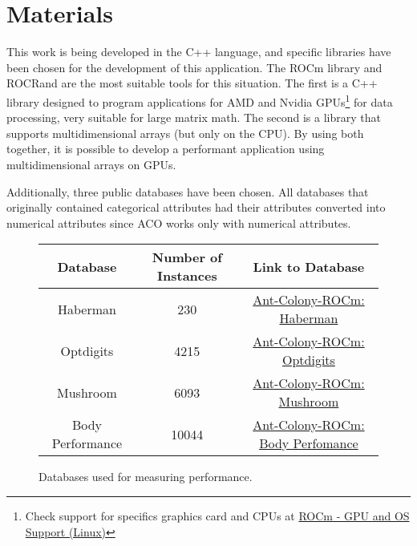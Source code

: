 \section{Materials} \label{Materials}

This work is being developed in the C++ language, and specific libraries have been chosen for the development of this application. The ROCm library\cite{rocm} and ROCRand\cite{rocrand} are the most suitable tools for this situation.
The first is a C++ library designed to program applications for AMD and Nvidia GPUs\footnote[1]{Check support for specifics graphics card and CPUs at \href{https://rocm.docs.amd.com/en/latest/release/gpu_os_support.html}{ROCm - GPU and OS Support (Linux)}} for data processing, very suitable for large matrix math.
The second is a library that supports multidimensional arrays (but only on the CPU). By using both together, it is possible to develop a performant application using multidimensional arrays on GPUs.

Additionally, three public databases have been chosen. All databases that originally contained categorical attributes had their attributes converted into numerical attributes since ACO works only with numerical attributes.

\begin{figure}
    \begin{center}
        \begin{tabular}{|c|c|c|}
            \hline
            Database & Number of Instances & Link to Database \\
            \hline
            Haberman & 230 & \href{https://raw.githubusercontent.com/LucasSnatiago/Ant-Colony-ROCm/main/database/haberman_treino_normal.csv}{Ant-Colony-ROCm: Haberman} \\
            \hline
            Optdigits & 4215 & \href{https://raw.githubusercontent.com/LucasSnatiago/Ant-Colony-ROCm/main/database/optdigits_treino_normal.csv}{Ant-Colony-ROCm: Optdigits} \\
            \hline
            Mushroom & 6093 & \href{https://raw.githubusercontent.com/LucasSnatiago/Ant-Colony-ROCm/main/database/mushrooms_treino_normal.csv}{Ant-Colony-ROCm: Mushroom} \\
            \hline
            Body Performance & 10044 & \href{https://raw.githubusercontent.com/LucasSnatiago/Ant-Colony-ROCm/main/database/body_performance_treino_normal.csv}{Ant-Colony-ROCm: Body Perfomance} \\
            \hline
        \end{tabular}
        \caption{Databases used for measuring performance.}
    \end{center}
    \label{fig:datasets}
\end{figure}

